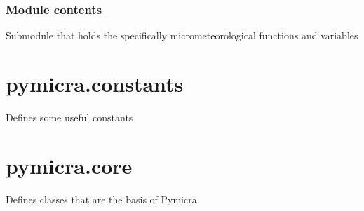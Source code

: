 \documentclass[a4paper,10pt,oneside]{sphinxmanual}
\begin{document}

\begin{fulllineitems}
\label{pymicra.micro:pymicra.micro.util.rotateCoor}
\end{fulllineitems}



\subsubsection{Module contents}
\label{pymicra.micro:module-contents}\label{pymicra.micro:module-pymicra.micro}
Submodule that holds the specifically micrometeorological functions and variables


\section{pymicra.constants}
\label{pymicra:module-pymicra.constants}\label{pymicra:pymicra-constants}
Defines some useful constants


\section{pymicra.core}
\label{pymicra:module-pymicra.core}\label{pymicra:pymicra-core}
Defines classes that are the basis of Pymicra
\end{document}
